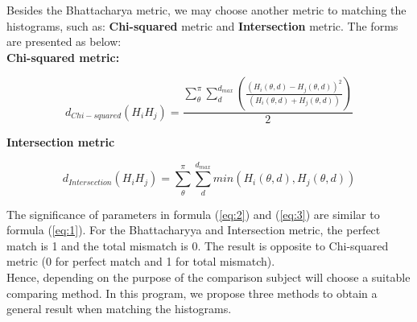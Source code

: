 Besides the Bhattacharya metric, we may choose another metric to matching the histograms, such as: \textbf{Chi-squared} metric and \textbf{Intersection} metric. The forms are presented as below:\\
\textbf{Chi-squared metric:}
\begin{center}
\begin{equation}\label{eq:2}
d_{Chi-squared} (H_{i}H_{j}) = \frac{\sum\limits_{\theta}^{\pi}\sum\limits_{d}^{d_{max}}(\frac{(H_{i}(\theta,d) - H_{j}(\theta,d))^{2}}{(H_{i}(\theta,d) + H_{j}(\theta,d))})}{2}
\end{equation}
\end{center}
\textbf{Intersection metric}
\begin{center}
\begin{equation}\label{eq:3}
d_{Intersection} (H_{i}H_{j}) = \sum\limits_{\theta}^{\pi}\sum\limits_{d}^{d_{max}}min(H_{i}(\theta,d), H_{j}(\theta,d))
\end{equation}
\end{center}
The significance of parameters in formula (\ref{eq:2}) and (\ref{eq:3}) are similar to formula (\ref{eq:1}). For the Bhattacharyya and Intersection metric, the perfect match is 1 and the total mismatch is 0. The result is opposite to Chi-squared metric (0 for perfect match and 1 for total mismatch).\\[0.2cm]
Hence, depending on the purpose of the comparison subject will choose a suitable comparing method. In this program, we propose three methods to obtain a general result when matching the histograms.
